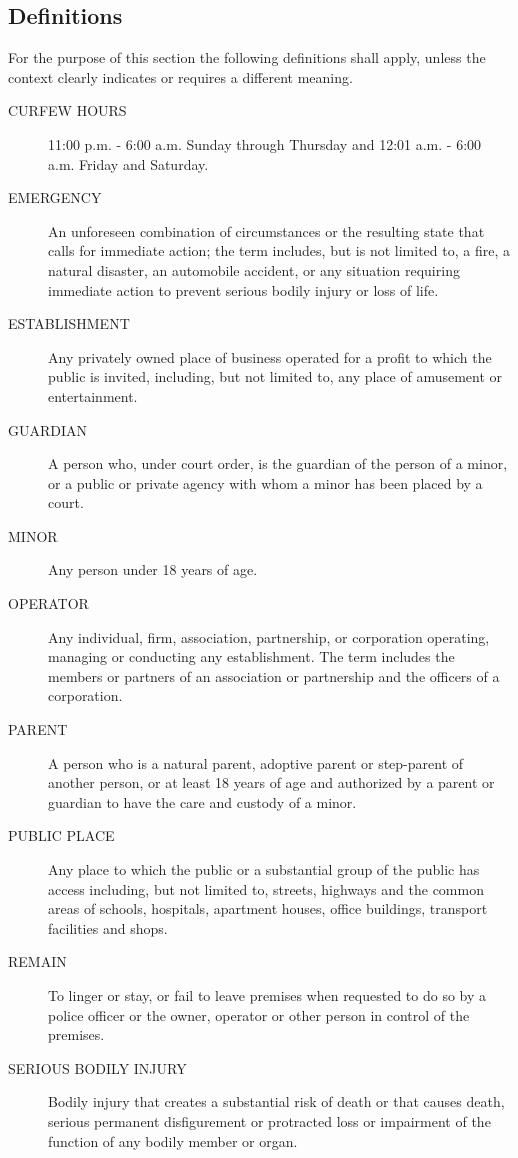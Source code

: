 \subsection{Definitions}
For the purpose of this section the following definitions shall apply, unless the context clearly indicates or requires a different meaning.
\begin{description}
    \item[CURFEW HOURS] 11:00 p.m. - 6:00 a.m. Sunday through Thursday and 12:01 a.m. - 6:00 a.m. Friday and Saturday.
    \item[EMERGENCY] An unforeseen combination of circumstances or the resulting state that calls for immediate action; the term includes, but is not limited to, a fire, a natural disaster, an automobile accident, or any situation requiring immediate action to prevent serious bodily injury or loss of life.
    \item[ESTABLISHMENT] Any privately owned place of business operated for a profit to which the public is invited, including, but not limited to, any place of amusement or entertainment.
    \item[GUARDIAN] A person who, under court order, is the guardian of the person of a minor, or a public or private agency with whom a minor has been placed by a court.
    \item[MINOR] Any person under 18 years of age.
    \item[OPERATOR] Any individual, firm, association, partnership, or corporation operating, managing or conducting any establishment.  The term includes the members or partners of an association or partnership and the officers of a corporation.
    \item[PARENT] A person who is a natural parent, adoptive parent or step-parent of another person, or at least 18 years of age and authorized by a parent or guardian to have the care and custody of a minor.
    \item[PUBLIC PLACE] Any place to which the public or a substantial group of the public has access including, but not limited to, streets, highways and the common areas of schools, hospitals, apartment houses, office buildings, transport facilities and shops.
    \item[REMAIN] To linger or stay, or fail to leave premises when requested to do so by a police officer or the owner, operator or other person in control of the premises.
    \item[SERIOUS BODILY INJURY] Bodily injury that creates a substantial risk of death or that causes death, serious permanent disfigurement or protracted loss or impairment of the function of any bodily member or organ.
\end{description}
